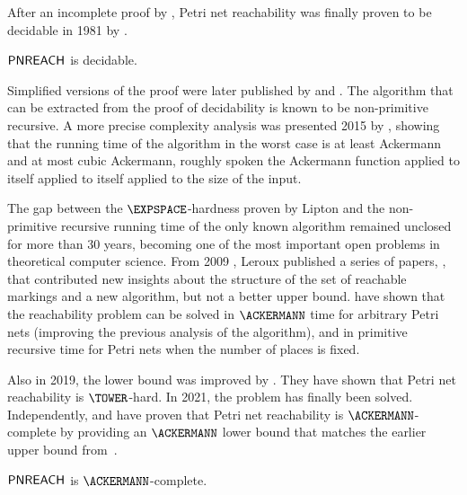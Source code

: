 \documentclass[../../diss.tex]{subfiles}
\begin{document}
After an incomplete proof by , Petri net reachability was finally proven to be decidable in 1981 by .

\begin{theorem}
    $\mathsf{PNREACH}$ is decidable.
\end{theorem}

Simplified versions of the proof were later published by  and .
The algorithm that can be extracted from the proof of decidability is known to be non-primitive recursive.
A more precise complexity analysis was presented 2015 by , showing that the running time of the algorithm in the worst case is at least Ackermann and at most cubic Ackermann, \ie roughly spoken the Ackermann function applied to itself applied to itself applied to the size of the input.

The gap between the $\EXPSPACE$-hardness proven by Lipton and the non-primitive recursive running time of the only known algorithm remained unclosed for more than 30 years, becoming one of the most important open problems in theoretical computer science.
From 2009 , Leroux published a series of papers, \eg \cite{Leroux11}, that contributed new insights about the structure of the set of reachable markings and a new algorithm, but not a better upper bound.
  have shown that the reachability problem can be solved in $\ACKERMANN$ time for arbitrary Petri nets (improving the previous analysis of the algorithm), and in primitive recursive time for Petri nets when the number of places is fixed.

Also in 2019, the lower bound was improved by . They have shown that Petri net reachability is $\TOWER$-hard.
In 2021, the problem has finally been solved.
Independently,  and  have proven that Petri net reachability is $\ACKERMANN$-complete by providing an $\ACKERMANN$ lower bound that matches the earlier upper bound from~\cite{LerouxS19}.

\begin{theorem}
    $\mathsf{PNREACH}$ is $\ACKERMANN$-complete.
\end{theorem}
\end{document}
